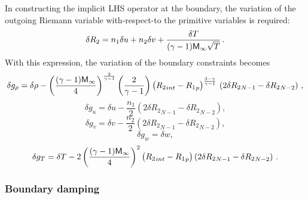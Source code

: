 In constructing the implicit LHS operator at the boundary, the variation of
the outgoing Riemann variable with-respect-to the primitive variables is
required:
%
\begin{equation}
  \delta R_2 = n_1 \delta u + n_2 \delta v + \frac{\delta T}{(\gamma-1)
               {\sf M}_\infty \sqrt{T}} {\, .}
\end{equation}
%
With this expression, the variation of the boundary constraints becomes
%
\begin{equation}
  \delta g_\rho = 
  \delta\rho - \left( \frac{(\gamma-1){\sf M}_\infty}{4} \right)^\frac{2}{\gamma-1}
               \left( \frac{2}{\gamma-1} \right) 
	       \left( {R_2}_{int} - {R_1}_p \right)^\frac{3-\gamma}{\gamma-1} 
	       \\ \left( 2 \delta{R_2}_{N-1} - \delta{R_2}_{N-2} \right) {\, ,}
\end{equation}
%
\begin{equation}
  \delta g_u = 
  \delta u - \frac{n_1}{2} \left( 2 \delta{R_2}_{N-1} - 
                                    \delta{R_2}_{N-2} \right) \comma
\end{equation}
%
\begin{equation}
  \delta g_v = 
  \delta v - \frac{n_2}{2} \left( 2 \delta{R_2}_{N-1} - 
                                    \delta{R_2}_{N-2} \right) \comma
\end{equation}
%
\begin{equation}
  \delta g_w = \delta w \comma
\end{equation}
%
\begin{equation}
  \delta g_T = 
  \delta T - 2 \left( \frac{(\gamma-1){\sf M}_\infty}{4} \right)^2
             \left( {R_2}_{int} - {R_1}_p \right)
	     \left( 2 \delta{R_2}_{N-1} - \delta{R_2}_{N-2} \right) {\, .}
\end{equation}

\subsubsection{Boundary damping \label{sss:damping} }

